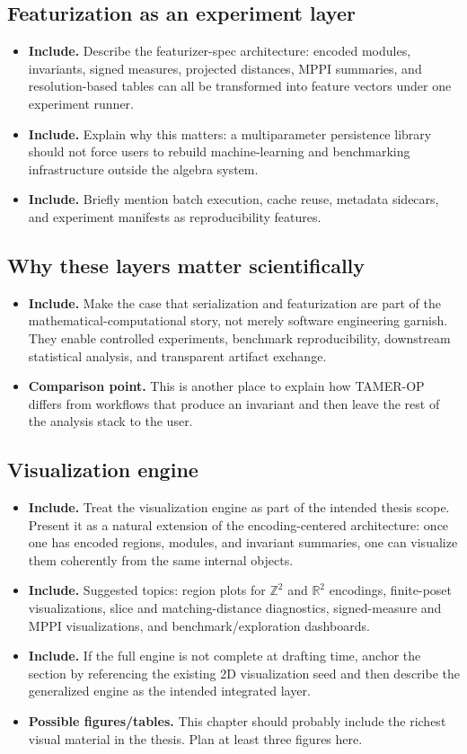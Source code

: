 \documentclass[11pt]{article}
\newcommand{\TAMER}{\textsc{TAMER-OP}}
\newenvironment{plan}{\begin{itemize}[leftmargin=1.6em,itemsep=0.35em,topsep=0.25em]}{\end{itemize}}
\newcommand{\includeitems}[1]{\item \textbf{Include.} #1}
\newcommand{\figures}[1]{\item \textbf{Possible figures/tables.} #1}
\newcommand{\compare}[1]{\item \textbf{Comparison point.} #1}
\begin{document}
\subsection{Featurization as an experiment layer}

\begin{plan}
    \includeitems{Describe the featurizer-spec architecture: encoded modules, invariants, signed measures, projected distances, MPPI summaries, and resolution-based tables can all be transformed into feature vectors under one experiment runner.}
    \includeitems{Explain why this matters: a multiparameter persistence library should not force users to rebuild machine-learning and benchmarking infrastructure outside the algebra system.}
    \includeitems{Briefly mention batch execution, cache reuse, metadata sidecars, and experiment manifests as reproducibility features.}
\end{plan}

\subsection{Why these layers matter scientifically}

\begin{plan}
    \includeitems{Make the case that serialization and featurization are part of the mathematical-computational story, not merely software engineering garnish. They enable controlled experiments, benchmark reproducibility, downstream statistical analysis, and transparent artifact exchange.}
    \compare{This is another place to explain how \TAMER{} differs from workflows that produce an invariant and then leave the rest of the analysis stack to the user.}
\end{plan}

\subsection{Visualization engine}

\begin{plan}
    \includeitems{Treat the visualization engine as part of the intended thesis scope. Present it as a natural extension of the encoding-centered architecture: once one has encoded regions, modules, and invariant summaries, one can visualize them coherently from the same internal objects.}
    \includeitems{Suggested topics: region plots for $\mathbb{Z}^2$ and $\mathbb{R}^2$ encodings, finite-poset visualizations, slice and matching-distance diagnostics, signed-measure and MPPI visualizations, and benchmark/exploration dashboards.}
    \includeitems{If the full engine is not complete at drafting time, anchor the section by referencing the existing 2D visualization seed and then describe the generalized engine as the intended integrated layer.}
    \figures{This chapter should probably include the richest visual material in the thesis. Plan at least three figures here.}
\end{plan}
\end{document}
